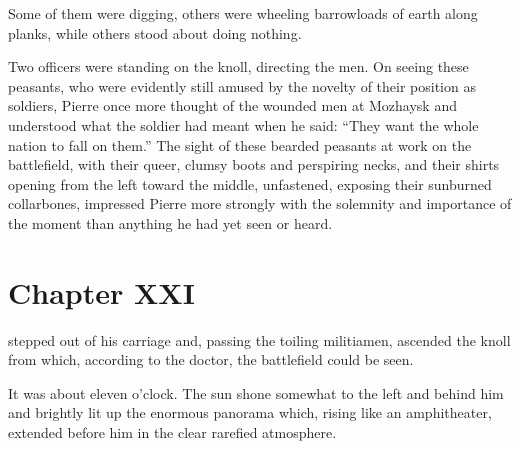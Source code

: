Some of them were digging, others were wheeling barrowloads of
earth along planks, while others stood about doing nothing.

Two officers were standing on the knoll, directing the men. On
seeing these peasants, who were evidently still amused by the
novelty of their position as soldiers, Pierre once more thought
of the wounded men at Mozhaysk and understood what the soldier
had meant when he said: ``They want the whole nation to fall on
them.'' The sight of these bearded peasants at work on the
battlefield, with their queer, clumsy boots and perspiring necks,
and their shirts opening from the left toward the middle,
unfastened, exposing their sunburned collarbones, impressed
Pierre more strongly with the solemnity and importance of the
moment than anything he had yet seen or heard.


\chapter*{Chapter XXI} \ifaudio {}
\fi

 stepped out of his carriage and, passing the toiling
militiamen, ascended the knoll from which, according to the
doctor, the battlefield could be seen.

It was about eleven o'clock. The sun shone somewhat to the left
and behind him and brightly lit up the enormous panorama which,
rising like an amphitheater, extended before him in the clear
rarefied atmosphere.

